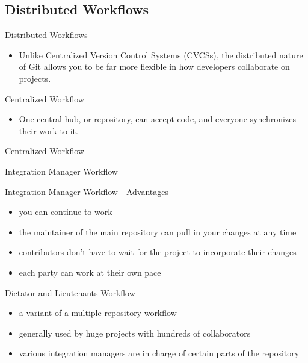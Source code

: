 \documentclass{beamer}
\begin{document}
\subsection{Distributed Workflows}

\begin{frame}{Distributed Workflows}
  \begin{itemize}
  \item
    Unlike Centralized Version Control Systems (CVCSs), the distributed nature of Git allows you to be far more flexible in how developers collaborate on projects.
  \end{itemize}
\end{frame}

\begin{frame}{Centralized Workflow}
  \begin{itemize}
  \item
    One central hub, or repository, can accept code, and everyone synchronizes their work to it.
  \end{itemize}
\end{frame}

\begin{frame}{Centralized Workflow}
    \centering
    \hfill\vfill
\end{frame}

\begin{frame}{Integration Manager Workflow}
    \centering
    \hfill\vfill
\end{frame}

\begin{frame}{Integration Manager Workflow - Advantages}
  \begin{itemize}
  \item
    you can continue to work
  \item
    the maintainer of the main repository can pull in your changes at any time
  \item
    contributors don't have to wait for the project to incorporate their changes
  \item
    each party can work at their own pace
  \end{itemize}
\end{frame}

\begin{frame}{Dictator and Lieutenants Workflow}
  \begin{itemize}
  \item
    a variant of a multiple-repository workflow
  \item
    generally used by huge projects with hundreds of collaborators
  \item
    various integration managers are in charge of certain parts of the repository
  \end{itemize}
\end{frame}
\end{document}
